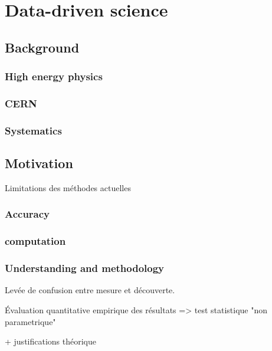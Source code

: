 
\chapter{Data-driven science}  %
\label{chap:intro_phy}
\ifpdf
    \graphicspath{{Chapter1/Figs/Raster/}{Chapter1/Figs/PDF/}{Chapter1/Figs/}}
\else
    \graphicspath{{Chapter1/Figs/Vector/}{Chapter1/Figs/}}
\fi





\section{Background}


\subsection{High energy physics} %
\label{sub:high_energy_physics}

\subsection{CERN} %
\label{sub:cern}


\subsection{Systematics} %
\label{sub:systematics}

\section{Motivation} %
\label{sec:motivation}

Limitations des méthodes actuelles

\subsection{Accuracy} %
\label{sub:accuracy}


\subsection{computation} %
\label{sub:computation}

\subsection{Understanding and methodology} %
\label{sub:understanding_and_methodology}

Levée de confusion entre mesure et découverte.

Évaluation quantitative empirique des résultats => test statistique "non parametrique"

+ justifications théorique
